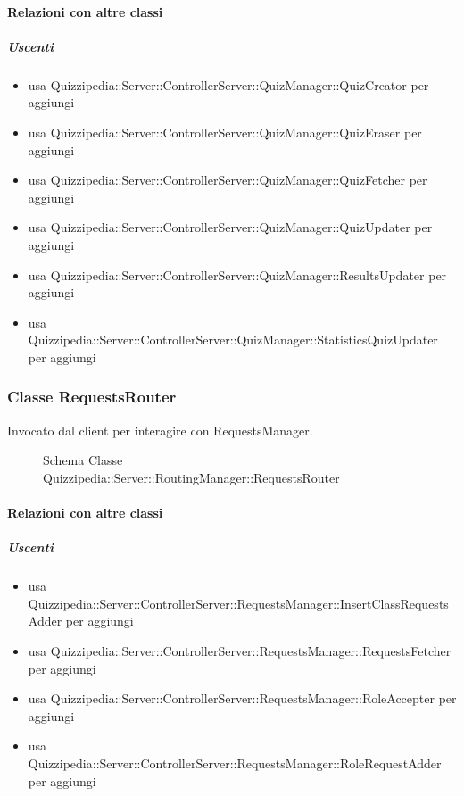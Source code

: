 \paragraph{Relazioni con altre classi}
\subparagraph{Uscenti}
\begin{itemize}
\item usa Quizzipedia::Server::ControllerServer::QuizManager::QuizCreator per aggiungi
\item usa Quizzipedia::Server::ControllerServer::QuizManager::QuizEraser per aggiungi
\item usa Quizzipedia::Server::ControllerServer::QuizManager::QuizFetcher per aggiungi
\item usa Quizzipedia::Server::ControllerServer::QuizManager::QuizUpdater per aggiungi
\item usa Quizzipedia::Server::ControllerServer::QuizManager::ResultsUpdater per aggiungi
\item usa Quizzipedia::Server::ControllerServer::QuizManager::StatisticsQuizUpdater per aggiungi
\end{itemize}
\subsubsection{Classe RequestsRouter}
Invocato dal client per interagire con RequestsManager.
\begin{figure}[H]
\centering
\noindent{}
\caption[Schema Classe RequestsRouter]{Schema Classe Quizzipedia::Server::RoutingManager::RequestsRouter}
\end{figure}
\paragraph{Relazioni con altre classi}
\subparagraph{Uscenti}
\begin{itemize}
\item usa Quizzipedia::Server::ControllerServer::RequestsManager::InsertClassRequestsAdder per aggiungi
\item usa Quizzipedia::Server::ControllerServer::RequestsManager::RequestsFetcher per aggiungi
\item usa Quizzipedia::Server::ControllerServer::RequestsManager::RoleAccepter per aggiungi
\item usa Quizzipedia::Server::ControllerServer::RequestsManager::RoleRequestAdder per aggiungi
\end{itemize}
